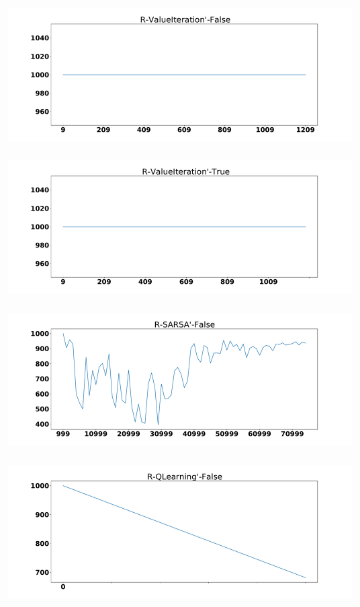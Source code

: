 \documentclass{amsart}
\begin{document}
            \begin{figure}
    \centering
    \begin{subfigure}[t]{0.3\textwidth}
    \centering
    \includegraphics[width=\textwidth]{Rtrack_2_learning_rate.pdf}
    \end{subfigure}
    \begin{subfigure}[t]{0.3\textwidth}
    \centering
    \includegraphics[width=\textwidth]{Rtrack_3_learning_rate.pdf}
    \end{subfigure}
    \begin{subfigure}[t]{0.3\textwidth}
    \centering
    \includegraphics[width=\textwidth]{Rtrack_6_learning_rate.pdf}
    \end{subfigure}
    \begin{subfigure}[t]{0.3\textwidth}
    \centering
    \includegraphics[width=\textwidth]{Rtrack_5_learning_rate.pdf}

\end{subfigure}
\end{figure}
\end{document}
